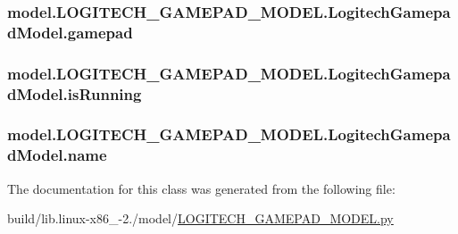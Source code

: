 \subsubsection[{gamepad}]{\setlength{\rightskip}{0pt plus 5cm}model.\+L\+O\+G\+I\+T\+E\+C\+H\+\_\+\+G\+A\+M\+E\+P\+A\+D\+\_\+\+M\+O\+D\+E\+L.\+Logitech\+Gamepad\+Model.\+gamepad}\label{classmodel_1_1LOGITECH__GAMEPAD__MODEL_1_1LogitechGamepadModel_a77eb2ddae3b91d8da8845214893c118d}
\hypertarget{classmodel_1_1LOGITECH__GAMEPAD__MODEL_1_1LogitechGamepadModel_a6c98021d546456249760f86386c7d406}{}
\subsubsection[{is\+Running}]{\setlength{\rightskip}{0pt plus 5cm}model.\+L\+O\+G\+I\+T\+E\+C\+H\+\_\+\+G\+A\+M\+E\+P\+A\+D\+\_\+\+M\+O\+D\+E\+L.\+Logitech\+Gamepad\+Model.\+is\+Running}\label{classmodel_1_1LOGITECH__GAMEPAD__MODEL_1_1LogitechGamepadModel_a6c98021d546456249760f86386c7d406}
\hypertarget{classmodel_1_1LOGITECH__GAMEPAD__MODEL_1_1LogitechGamepadModel_aca968abc43721d36876b94f20d9710d4}{}
\subsubsection[{name}]{\setlength{\rightskip}{0pt plus 5cm}model.\+L\+O\+G\+I\+T\+E\+C\+H\+\_\+\+G\+A\+M\+E\+P\+A\+D\+\_\+\+M\+O\+D\+E\+L.\+Logitech\+Gamepad\+Model.\+name}\label{classmodel_1_1LOGITECH__GAMEPAD__MODEL_1_1LogitechGamepadModel_aca968abc43721d36876b94f20d9710d4}


The documentation for this class was generated from the following file\+:\begin{DoxyCompactItemize}
\item 
build/lib.\+linux-\/x86\+\_-\/2./model/\hyperlink{build_2lib_8linux-x86__64-2_87_2model_2LOGITECH__GAMEPAD__MODEL_8py}{L\+O\+G\+I\+T\+E\+C\+H\+\_\+\+G\+A\+M\+E\+P\+A\+D\+\_\+\+M\+O\+D\+E\+L.\+py}\end{DoxyCompactItemize}
